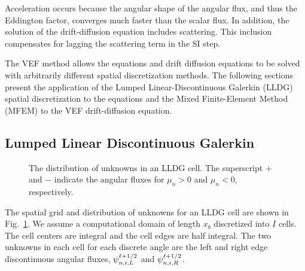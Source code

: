 Acceleration occurs because the angular shape of the angular flux, and thus the Eddington factor, converges much faster than the scalar flux. In addition, the solution of the drift-diffusion equation includes scattering. This inclusion compensates for lagging the scattering term in the SI step. 

The VEF method allows the \SN equations and drift diffusion equations to be solved with arbitrarily different spatial discretization methods. The following sections  present the application of the Lumped Linear-Discontinuous Galerkin (LLDG) spatial discretization to the \SN equations and the Mixed Finite-Element Method (MFEM) to the VEF drift-diffusion equation. 

\subsection{Lumped Linear Discontinuous Galerkin \SN}
\begin{figure}
	\centering
	
	\caption{The distribution of unknowns in an LLDG cell. The superscript $+$ and $-$ indicate the angular fluxes for $\mu_n>0$ and $\mu_n<0$, respectively. } 
	\label{fig:lldg_grid}
\end{figure}
The spatial grid and distribution of unknowns for an LLDG cell are shown in Fig.~\ref{fig:lldg_grid}. We assume a computational domain of length $x_b$ discretized into $I$ cells. The cell centers are integral and the cell edges are half integral. The two unknowns in each cell for each discrete angle are the left and right edge discontinuous angular fluxes, $\psi_{n,i,L}^{\ell+1/2}$ and $\psi_{n,i,R}^{\ell+1/2}$. 


